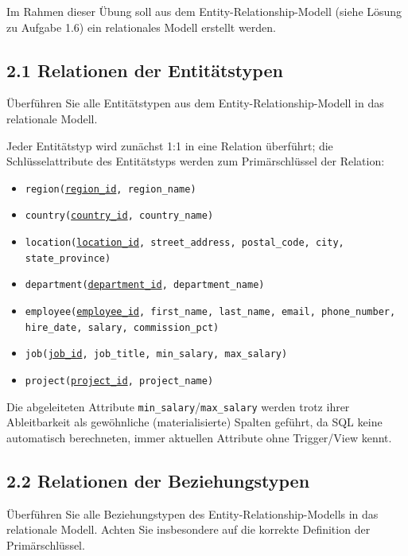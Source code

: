\documentclass[11pt,a4paper]{article}
\newcommand{\pk}[1]{\underline{#1}}
\begin{document}
Im Rahmen dieser \"Ubung soll aus dem Entity-Relationship-Modell (siehe L\"osung zu Aufgabe 1.6) ein relationales Modell erstellt werden.

\subsection*{2.1 \quad Relationen der Entit\"atstypen}
\"Uberf\"uhren Sie alle Entit\"atstypen aus dem Entity-Relationship-Modell in das relationale Modell.

\begin{loesung}
Jeder Entit\"atstyp wird zun\"achst 1:1 in eine Relation \"uberf\"uhrt; die Schl\"usselattribute des Entit\"atstyps werden zum Prim\"arschl\"ussel der Relation:
\begin{itemize}
\item \texttt{region(\pk{region\_id}, region\_name)}
\item \texttt{country(\pk{country\_id}, country\_name)}
\item \texttt{location(\pk{location\_id}, street\_address, postal\_code, city, state\_province)}
\item \texttt{department(\pk{department\_id}, department\_name)}
\item \texttt{employee(\pk{employee\_id}, first\_name, last\_name, email, phone\_number, hire\_date, salary, commission\_pct)}
\item \texttt{job(\pk{job\_id}, job\_title, min\_salary, max\_salary)}
\item \texttt{project(\pk{project\_id}, project\_name)}
\end{itemize}
Die abgeleiteten Attribute \texttt{min\_salary}/\texttt{max\_salary} werden trotz ihrer Ableitbarkeit als gew\"ohnliche (materialisierte) Spalten gef\"uhrt, da SQL keine automatisch berechneten, immer aktuellen Attribute ohne Trigger/View kennt.
\end{loesung}

\subsection*{2.2 \quad Relationen der Beziehungstypen}
\"Uberf\"uhren Sie alle Beziehungstypen des Entity-Relationship-Modells in das relationale Modell. Achten Sie insbesondere auf die korrekte Definition der Prim\"arschl\"ussel.
\end{document}
